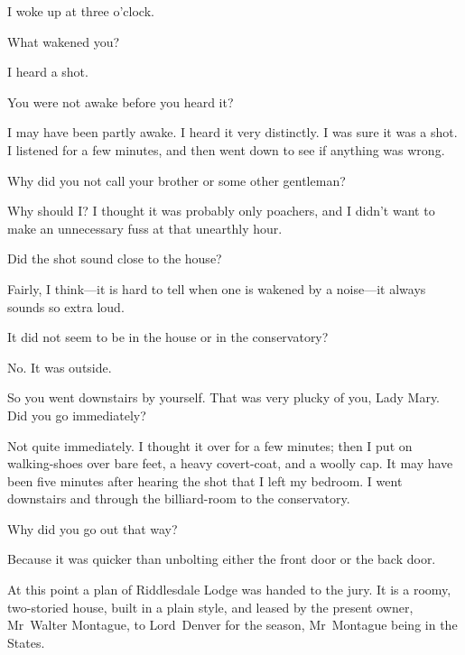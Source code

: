\begin{dialogue}
 I woke up at three o'clock.

 What wakened you?

 I heard a shot.

 You were not awake before you heard it?

 I may have been partly awake. I heard it very distinctly. I was sure it was a shot. I listened for a few minutes, and then went down to see if anything was wrong.

 Why did you not call your brother or some other gentleman?

  Why should I? I thought it was probably only poachers, and I didn't want to make an unnecessary fuss at that unearthly hour.

 Did the shot sound close to the house?

 Fairly, I think—it is hard to tell when one is wakened by a noise—it always sounds so extra loud.

 It did not seem to be in the house or in the conservatory?

 No. It was outside.

 So you went downstairs by yourself. That was very plucky of you, Lady Mary. Did you go immediately?

 Not quite immediately. I thought it over for a few minutes; then I put on walking-shoes over bare feet, a heavy covert-coat, and a woolly cap. It may have been five minutes after hearing the shot that I left my bedroom. I went downstairs and through the billiard-room to the conservatory.

 Why did you go out that way?

 Because it was quicker than unbolting either the front door or the back door.
\end{dialogue}

At this point a plan of Riddlesdale Lodge was handed to the jury. It is a roomy, two-storied house, built in a plain style, and leased by the present owner, Mr~Walter Montague, to Lord~Denver for the season, Mr~Montague being in the States.

